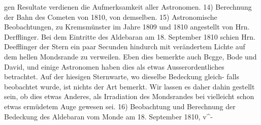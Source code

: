\documentclass[12pt,a4paper]{article}
\begin{document}
gen Resultate verdienen die Aufmerksamkeit aller Astronomen. 14) Berechnung der Bahn des Cometen\newline
von 1810, von demselben. 15) Astronomische Beobachtungen, zu Kremsmünster im Jahre 1809 und 1810\newline
angestellt von Hrn. Derfflinger. Bei dem Eintritte des Aldebaran am 18. September 1810 schien Hrn.\newline
Deefflinger der Stern ein paar Secunden hindurch mit verändertem Lichte auf dem hellen Mondsrande\newline
zu verweilen. Eben dies bemerkte auch Bcgge, Bode und David, und einige Astronomen haben dies\newline
als etwas Ausserordentliches betrachtet. Auf der hiesigen Sternwarte, wo dieselbe Bedeckung gleich-\newline
falls beobachtet wurde, ist nichts der Art bemerkt. Wir lassen es daher dahin gestellt sein, ob dies\newline
etwas Anderes, als Irradiation des Mondsrandes bei vielleicht schon etwas ermüdetem Auge gewesen\newline
sei. 16) Beobachtung und Berechnung der Bedeckung des Aldebaran vom Monde am 18. September 1810,\newline
v\^{}-\newline
\end{document}
